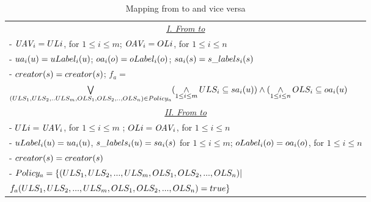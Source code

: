  
\begin{table}[t]
	\centering
	\caption{ Mapping from \EPMNModel{} to \LPMN{} and vice versa } %
	\label{tab:mapping-epmn-lpmn}
	\begin{tabular}{|l|}						
		\hline					
				   
			 \multicolumn{1}{|c|}{\underline{\textit{I. From \EPMNModel{} to \LPMN{}}}}\\	
				 - $\textit{UAV}_{i} = UL{i}$, for $ 1 \le i \le m$; $\textit{OAV}_{i} = OL{i}$, for $ 1 \le i \le n$\\
				 - $ua_{i}(u) = uLabel_{i}(u)$; $oa_{i}(o) = oLabel_{i}(o)$; $sa_{i}(s) = s\_labels_{i}(s)$\\
				 - $creator(s) = creator(s)$;  $ f_a =$ \\
				  $\mathop{\bigvee}\limits_{ ( ULS_{1}, ULS_{2},..ULS_{m}, OLS_{1}, OLS_{2},..,OLS_{n}) \in Policy_a}  (\mathop{\wedge}\limits_{ 1 \le i \le m } ULS_{i} \subseteq sa_{i}(u) ) \wedge ( \mathop{\wedge}\limits_{ 1 \le i \le n } OLS_{i} \subseteq oa_{i}(u)$ \\

			\multicolumn{1}{|c|}{\underline{\textit{II. From \LPMN{} to \EPMNModel{}}}}\\	
			
				- $UL{i} = \textit{UAV}_{i}$, for $ 1 \le i \le m$ ; $OL{i} = \textit{OAV}_{i}$, for $ 1 \le i \le n$\\
				- $uLabel_{i}(u) = ua_{i}(u)$, $s\_labels_{i}(u) = sa_{i}(s)$ for $ 1 \le i \le m$; $oLabel_{i}(o) = oa_{i}(o)$, for $ 1 \le i \le n$\\
			    -  $creator(s) = creator(s)$\\ 
			    - $Policy_a = \{ ( ULS_{1}, ULS_{2}, ..., ULS_{m}, OLS_{1}, OLS_{2}, ..., OLS_{n}) |$ \\ \hfill $ f_a( ULS_{1}, ULS_{2}, ..., ULS_{m}, OLS_{1}, OLS_{2}, ..., OLS_{n}) = true \}$\\
			 
		 \hline	
	\end{tabular}	

	
\end{table}
